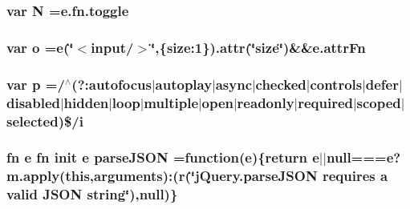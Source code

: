 \subsubsection[{N}]{\setlength{\rightskip}{0pt plus 5cm}var N ={\bf e.\+fn.\+toggle}}\label{jquery-migrate-1_82_81_8min_8js_abadc8a6494eb0561422367930ee2c126}
\hypertarget{jquery-migrate-1_82_81_8min_8js_a400dc8109620963da8314d4bdfa14f83}{}
\subsubsection[{o}]{\setlength{\rightskip}{0pt plus 5cm}var o ={\bf e}(\char`\"{}$<$input/$>$\char`\"{},\{size\+:1\}).{\bf attr}(\char`\"{}size\char`\"{})\&\&e.\+attr\+Fn}\label{jquery-migrate-1_82_81_8min_8js_a400dc8109620963da8314d4bdfa14f83}
\hypertarget{jquery-migrate-1_82_81_8min_8js_ad1707b001240e9c8298830073364c8bf}{}
\subsubsection[{p}]{\setlength{\rightskip}{0pt plus 5cm}var p =/$^\wedge$(?\+:autofocus$\vert$autoplay$\vert$async$\vert$checked$\vert$controls$\vert$defer$\vert$disabled$\vert$hidden$\vert$loop$\vert$multiple$\vert$open$\vert$readonly$\vert$required$\vert$scoped$\vert$selected)\$/{\bf i}}\label{jquery-migrate-1_82_81_8min_8js_ad1707b001240e9c8298830073364c8bf}
\hypertarget{jquery-migrate-1_82_81_8min_8js_a78744aa01b6245cc7f2a7fedfe14a390}{}
\subsubsection[{parse\+J\+S\+O\+N}]{ {\bf fn} {\bf e} {\bf fn} {\bf init} {\bf e} parse\+J\+S\+O\+N =function({\bf e})\{return {\bf e}$\vert$$\vert$null==={\bf e}?m.\+apply({\bf this},arguments)\+:({\bf r}(\char`\"{}j\+Query.\+parse\+J\+S\+O\+N requires {\bf a} valid J\+S\+O\+N string\char`\"{}),null)\}}\label{jquery-migrate-1_82_81_8min_8js_a78744aa01b6245cc7f2a7fedfe14a390}
\hypertarget{jquery-migrate-1_82_81_8min_8js_a58b9d909b30dda5f8f279e559872ab72}{}
